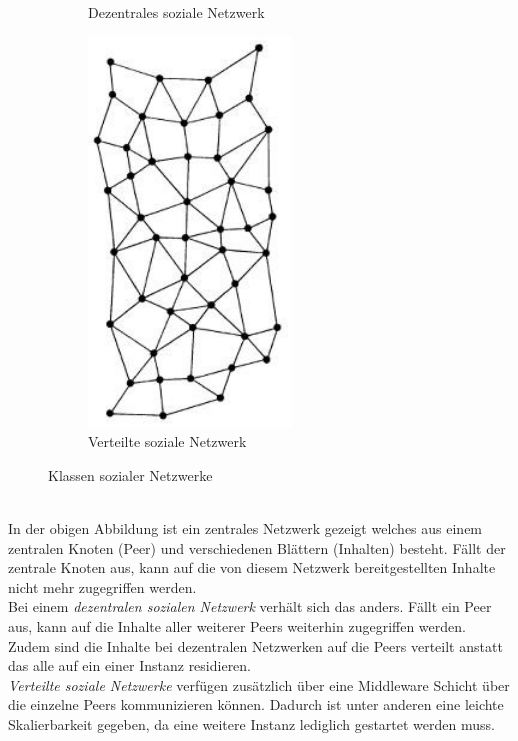 \begin{figure}[!t]
\begin{subfigure}[t]{0.4\linewidth}
			\caption{Dezentrales soziale Netzwerk}
			\label{fig:decentral-network}
		\end{subfigure}
		\begin{subfigure}[t]{0.4\linewidth}
			\centering
			\includegraphics[width=0.4\linewidth]{figures/distributed-network.png}
			\caption{Verteilte soziale Netzwerk}
			\label{fig:distributed-network}
		\end{subfigure}
		\vspace{4pt}
		\caption{Klassen sozialer Netzwerke}
	\end{figure}\\

	In der obigen Abbildung ist ein zentrales Netzwerk gezeigt welches aus einem zentralen Knoten (Peer) und verschiedenen Blättern (Inhalten) besteht. Fällt der zentrale Knoten aus, kann auf die von diesem Netzwerk bereitgestellten Inhalte nicht mehr zugegriffen werden.\\
	
	Bei einem \textit{dezentralen sozialen Netzwerk} verhält sich das anders. Fällt ein Peer aus, kann auf die Inhalte aller weiterer Peers weiterhin zugegriffen werden. Zudem sind die Inhalte bei dezentralen Netzwerken auf die Peers verteilt anstatt das alle auf ein einer Instanz residieren.\\
	
	\textit{Verteilte soziale Netzwerke} verfügen zusätzlich über eine Middleware Schicht über die einzelne Peers kommunizieren können. Dadurch ist unter anderen eine leichte Skalierbarkeit gegeben, da eine weitere Instanz lediglich gestartet werden muss.\\
	
